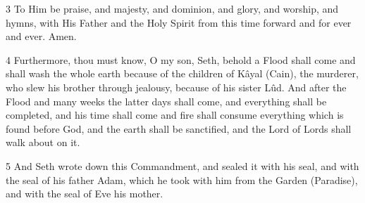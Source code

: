\par 3 To Him be praise, and majesty, and dominion, and glory, and worship, and hymns, with His Father and the Holy Spirit from this time forward and for ever and ever. Amen.

\par 4 Furthermore, thou must know, O my son, Seth, behold a Flood shall come and shall wash the whole earth because of the children of Kâyal (Cain), the murderer, who slew his brother through jealousy, because of his sister Lûd. And after the Flood and many weeks the latter days shall come, and everything shall be completed, and his time shall come and fire shall consume everything which is found before God, and the earth shall be sanctified, and the Lord of Lords shall walk about on it.

\par 5 And Seth wrote down this Commandment, and sealed it with his seal, and with the seal of his father Adam, which he took with him from the Garden (Paradise), and with the seal of Eve his mother.

